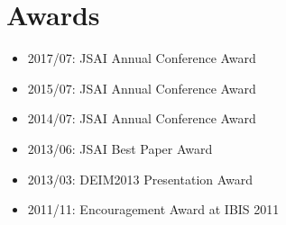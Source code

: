 \documentclass[a4paper,9pt]{article}
\begin{document}
\section*{Awards}
\begin{itemize}
 \item 2017/07: JSAI Annual Conference Award
 \item 2015/07: JSAI Annual Conference Award
 \item 2014/07: JSAI Annual Conference Award
 \item 2013/06: JSAI Best Paper Award
 \item 2013/03: DEIM2013 Presentation Award
 \item 2011/11: Encouragement Award at IBIS 2011
\end{itemize}
\end{document}
